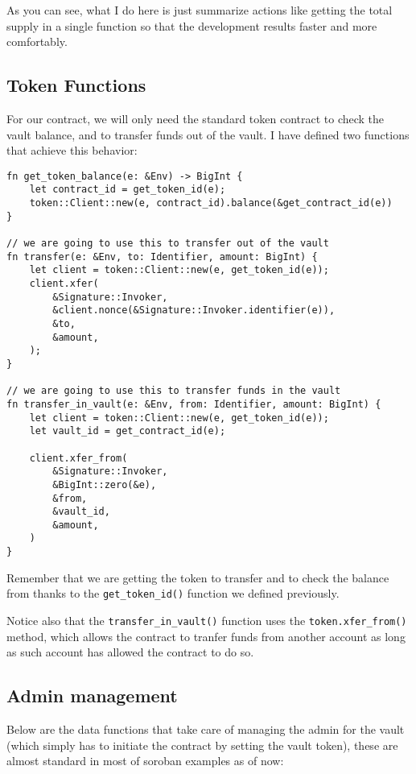 \documentclass{article}
\newcommand{\inl}[1]{\lstinline{#1}}
\begin{document}
As you can see, what I do here is just summarize actions like getting the total supply in a single function so that the development results faster and more comfortably.

\subsection{Token Functions}
For our contract, we will only need the standard token contract to check the vault balance, and to transfer funds out of the vault. I have defined two functions that achieve this behavior:

\begin{lstlisting}
fn get_token_balance(e: &Env) -> BigInt {
    let contract_id = get_token_id(e);
    token::Client::new(e, contract_id).balance(&get_contract_id(e))
}

// we are going to use this to transfer out of the vault
fn transfer(e: &Env, to: Identifier, amount: BigInt) {
    let client = token::Client::new(e, get_token_id(e));
    client.xfer(
        &Signature::Invoker,
        &client.nonce(&Signature::Invoker.identifier(e)),
        &to,
        &amount,
    );
}

// we are going to use this to transfer funds in the vault
fn transfer_in_vault(e: &Env, from: Identifier, amount: BigInt) {
    let client = token::Client::new(e, get_token_id(e));
    let vault_id = get_contract_id(e);

    client.xfer_from(
        &Signature::Invoker,
        &BigInt::zero(&e),
        &from,
        &vault_id,
        &amount,
    )
}
\end{lstlisting}

Remember that we are getting the token to transfer and to check the balance from thanks to the \inl{get_token_id()} function we defined previously.

Notice also that the \inl{transfer_in_vault()} function uses the \inl{token.xfer_from()} method, which allows the contract to tranfer funds from another account as long as such account has allowed the contract to do so.


\subsection{Admin management}
Below are the data functions that take care of managing the admin for the vault (which simply has to initiate the contract by setting the vault token), these are almost standard in most of soroban examples as of now:
\end{document}
